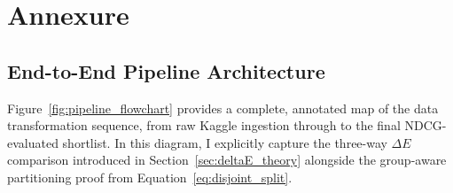 \chapter{Annexure}
\label{ch:annexure}

\section{End-to-End Pipeline Architecture}
\label{sec:appendix_flowchart}

Figure~\ref{fig:pipeline_flowchart} provides a complete, annotated map of the data transformation sequence, from raw Kaggle ingestion through to the final NDCG-evaluated shortlist. In this diagram, I explicitly capture the three-way $\Delta E$ comparison introduced in Section~\ref{sec:deltaE_theory} alongside the group-aware partitioning proof from Equation~\eqref{eq:disjoint_split}.

